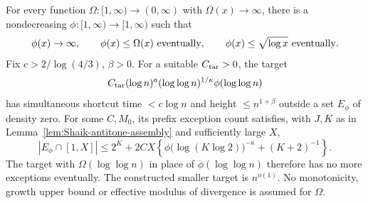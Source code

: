 \begin{proposition}
\label{prop:Shaik-slow-factor}
For every function \(\Omega:[1,\infty)\to(0,\infty)\) with
\(\Omega(x)\to\infty\), there is a nondecreasing
\(\phi:[1,\infty)\to[1,\infty)\) such that
\[
 \phi(x)\to\infty,\qquad \phi(x)\le\Omega(x)\ \hbox{eventually},\qquad
 \phi(x)\le\sqrt{\log x}\ \hbox{eventually}.
\]
Fix \(c>2/\log(4/3)\), \(\beta>0\).
For a suitable \(C_{\rm tar}>0\), the target
\begin{equation}\label{eq:Shaik-slow-target}
 C_{\rm tar}(\log n)^a(\log\log n)^{1/\kappa}\phi(\log\log n)
\end{equation}
has simultaneous shortcut time \(<c\log n\) and height
\(\le n^{1+\beta}\) outside a set \(E_\phi\) of density zero.
For some \(C,M_0\), its prefix exception count satisfies, with \(J,K\)
as in Lemma~\ref{lem:Shaik-antitone-assembly} and sufficiently large \(X\),
\begin{equation}\label{eq:Shaik-slow-prefix}
 |E_\phi\cap[1,X]|
 \le 2^K+2CX\left\{
       \phi\bigl(\log(K\log2)\bigr)^{-\kappa}+(K+2)^{-1}\right\}.
\end{equation}
The target with \(\Omega(\log\log n)\) in place of \(\phi(\log\log n)\)
therefore has no more exceptions eventually. The constructed smaller
target is \(n^{o(1)}\). No monotonicity, growth upper bound or effective
modulus of divergence is assumed for \(\Omega\).
\end{proposition}
